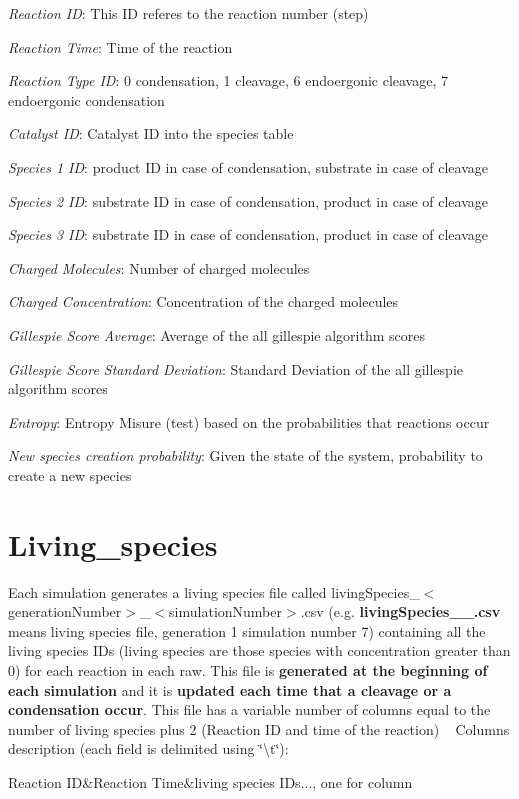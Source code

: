 \begin{DoxyItemize}
\item {\itshape Reaction I\+D}\+: This I\+D referes to the reaction number (step)
\item {\itshape Reaction Time}\+: Time of the reaction
\item {\itshape Reaction Type I\+D}\+: 0 condensation, 1 cleavage, 6 endoergonic cleavage, 7 endoergonic condensation
\item {\itshape Catalyst I\+D}\+: Catalyst I\+D into the species table
\item {\itshape Species 1 I\+D}\+: product I\+D in case of condensation, substrate in case of cleavage
\item {\itshape Species 2 I\+D}\+: substrate I\+D in case of condensation, product in case of cleavage
\item {\itshape Species 3 I\+D}\+: substrate I\+D in case of condensation, product in case of cleavage
\item {\itshape Charged Molecules}\+: Number of charged molecules
\item {\itshape Charged Concentration}\+: Concentration of the charged molecules
\item {\itshape Gillespie Score Average}\+: Average of the all gillespie algorithm scores
\item {\itshape Gillespie Score Standard Deviation}\+: Standard Deviation of the all gillespie algorithm scores
\item {\itshape Entropy}\+: Entropy Misure (test) based on the probabilities that reactions occur
\item {\itshape New species creation probability}\+: Given the state of the system, probability to create a new species
\end{DoxyItemize}\hypertarget{a00006_outLivSpecies}{}\section{Living\+\_\+species}\label{a00006_outLivSpecies}
Each simulation generates a living species file called living\+Species\+\_\+$<$generation\+Number$>$\+\_\+$<$simulation\+Number$>$.\+csv (e.\+g. {\bfseries living\+Species\+\_\+\_.\+csv} means living species file, generation 1 simulation number 7) containing all the living species I\+Ds (living species are those species with concentration greater than 0) for each reaction in each raw. This file is {\bfseries generated at the beginning of each simulation} and it is {\bfseries updated each time that a cleavage or a condensation occur}. This file has a variable number of columns equal to the number of living species plus 2 (Reaction I\+D and time of the reaction) ~\newline
Columns description (each field is delimited using \char`\"{}\textbackslash{}t\char`\"{})\+: \begin{TabularC}{3}
\hline
Reaction I\+D&Reaction Time&living species I\+Ds..., one for column  \\
\end{TabularC}

